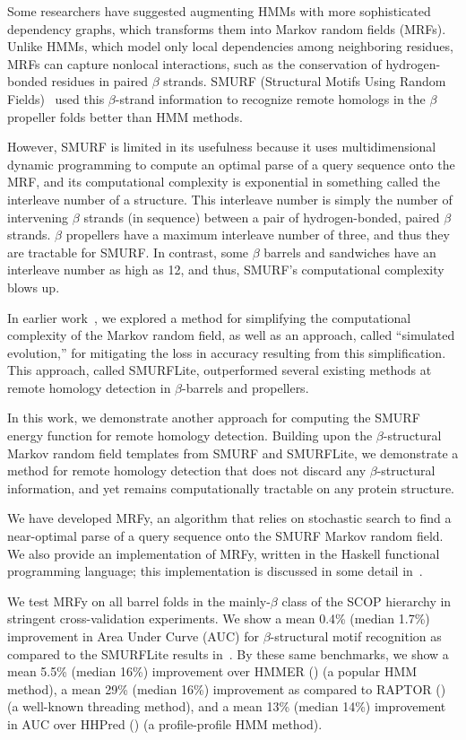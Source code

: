 \documentclass{acm_proc_article-sp}
\begin{document}
Some researchers have suggested augmenting HMMs with more sophisticated 
dependency graphs, which transforms them into Markov random fields (MRFs).
Unlike HMMs, which model only local dependencies among neighboring residues, 
MRFs can capture nonlocal interactions, such as the conservation of hydrogen- 
bonded residues in paired $\beta$ strands. 
SMURF (Structural Motifs Using Random Fields)~\cite{Menke:2010ti} used this 
$\beta$-strand information to recognize remote homologs in the $\beta$ propeller 
folds better than HMM methods. 

However, SMURF is limited in its usefulness because it uses multidimensional 
dynamic programming to compute an optimal parse of a query sequence onto the 
MRF, and its computational complexity is exponential in something called the 
interleave number of a structure. 
This interleave number is simply the number of intervening $\beta$ strands (in 
sequence) between a pair of hydrogen-bonded, paired $\beta$ strands. 
$\beta$ propellers have a maximum interleave number of three, and thus they are 
tractable for SMURF. 
In contrast, some $\beta$ barrels and sandwiches have an interleave number as
high as 12, and thus, SMURF's computational complexity blows up.

In earlier work~\cite{Daniels:2012dg}, we explored a method for simplifying the
computational complexity of the Markov random field, as well as an approach,
called ``simulated evolution,'' for mitigating the loss in accuracy resulting
from this simplification.
This approach, called SMURFLite, outperformed several existing
methods at remote homology detection in $\beta$-barrels and propellers.

In this work, we demonstrate another approach for computing the SMURF energy 
function for remote homology detection.
Building upon the $\beta$-structural Markov random field templates from SMURF 
and
SMURFLite, we demonstrate a method for remote homology detection that does not
discard any $\beta$-structural information, and yet remains computationally 
tractable on any protein structure.

We have developed MRFy, an algorithm that relies on stochastic search to find
a near-optimal parse of a query sequence onto the SMURF Markov random field.
We also provide an implementation of MRFy, written in the Haskell functional
programming language; this implementation is discussed in some detail 
in~\cite{Daniels:2012cm}.

We test MRFy on all barrel folds in the mainly-$\beta$
class of the SCOP hierarchy in stringent cross-validation
experiments. We show a mean 0.4\% (median 1.7\%) improvement in Area Under 
Curve (AUC) for
$\beta$-structural motif recognition as compared to the SMURFLite results 
in~\cite{Daniels:2012dg}.
By these same benchmarks, we show a mean 5.5\% (median 16\%) improvement over
HMMER (\cite{Eddy:1998ut}) (a popular HMM method), a mean 29\% (median
16\%) improvement as compared to RAPTOR (\cite{Xu:2003p3417}) (a
well-known threading method), and a mean 13\% (median 14\%) improvement in AUC 
over HHPred (\cite{Soding:2005ff}) (a profile-profile HMM method).
\end{document}
